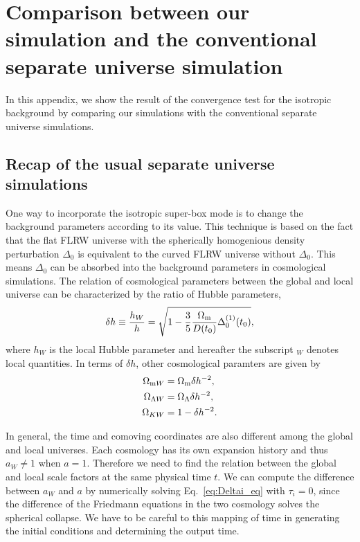 \documentclass[a4paper,11pt]{article}
\begin{document}


\appendix

\section{Comparison between our simulation and the conventional separate universe simulation}
\label{app:SU_comp}
In this appendix, we show the result of the convergence test for the isotropic background
by comparing our simulations with the conventional separate universe simulations.
\subsection{Recap of the usual separate universe simulations}  
One way to incorporate the isotropic super-box mode is to change the background parameters according to its value.
This technique is based on the fact that
the flat FLRW universe with the spherically homogenious density perturbation $\Delta_0$ is
equivalent to the curved FLRW universe without $\Delta_0$.
This means $\Delta_0$ can be absorbed into the background parameters in cosmological simulations.
The relation of cosmological parameters between the global and local universe can be characterized 
by the ratio of Hubble parameters,
\begin{align}
\delta h \equiv \frac{h_W}{h} = \sqrt{1- \frac35 \frac{\Omega_{\rm m}}{D(t_0)}\Delta_0^{(1)}(t_0) },
\end{align} 
where $h_W$ is the local Hubble parameter and hereafter the subscript $_W$ denotes local quantities.
In terms of $\delta h$, other cosmological paramters are given by
\begin{align}
\Omega_{{\rm m}W} &= \Omega_{{\rm m}}  \delta h^{-2},\\
\Omega_{\Lambda W} &= \Omega_{\Lambda} \delta h^{-2},\\
\Omega_{KW} &= 1 - \delta h^{-2}.
\end{align}

In general, the time and comoving coordinates are also different among the global and local universes.
Each cosmology has its own expansion history and thus $a_W\neq 1$ when $a=1$. 
Therefore we need to find the relation between the global and local scale factors at the same physical time $t$.
We can compute the difference between $a_W$ and $a$ by numerically solving Eq.~\eqref{eq:Deltai_eq} with $\tau_i=0$,
since the difference of the Friedmann equations in the two cosmology solves the spherical collapse.
We have to be careful to this mapping of time in generating the initial conditions and determining the output time. 
\end{document}
